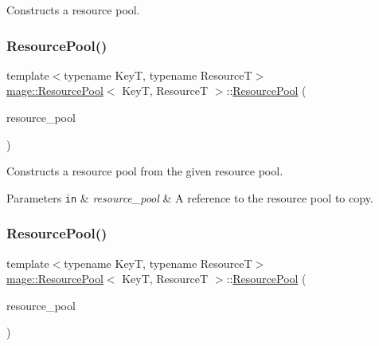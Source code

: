 Constructs a resource pool. \hypertarget{classmage_1_1_resource_pool_a82253c9c4adfc120a813dfe811dd5e91}{}\label{classmage_1_1_resource_pool_a82253c9c4adfc120a813dfe811dd5e91} 
\subsubsection{\texorpdfstring{Resource\+Pool()}{ResourcePool()}\hspace{0.1cm}{\footnotesize\ttfamily [2/3]}}
{\footnotesize\ttfamily template$<$typename KeyT, typename ResourceT$>$ \\
\hyperlink{classmage_1_1_resource_pool}{mage\+::\+Resource\+Pool}$<$ KeyT, ResourceT $>$\+::\hyperlink{classmage_1_1_resource_pool}{Resource\+Pool} (\begin{DoxyParamCaption}\item[{const \hyperlink{classmage_1_1_resource_pool}{Resource\+Pool}$<$ KeyT, ResourceT $>$ \&}]{resource\+\_\+pool }\end{DoxyParamCaption})\hspace{0.3cm}{\ttfamily [delete]}}

Constructs a resource pool from the given resource pool.


\begin{DoxyParams}[1]{Parameters}
\mbox{\tt in}  & {\em resource\+\_\+pool} & A reference to the resource pool to copy. \\
\hline
\end{DoxyParams}
\hypertarget{classmage_1_1_resource_pool_adf8c262e3fb0c01c8efb9650bf05951b}{}\label{classmage_1_1_resource_pool_adf8c262e3fb0c01c8efb9650bf05951b} 
\subsubsection{\texorpdfstring{Resource\+Pool()}{ResourcePool()}\hspace{0.1cm}{\footnotesize\ttfamily [3/3]}}
{\footnotesize\ttfamily template$<$typename KeyT, typename ResourceT$>$ \\
\hyperlink{classmage_1_1_resource_pool}{mage\+::\+Resource\+Pool}$<$ KeyT, ResourceT $>$\+::\hyperlink{classmage_1_1_resource_pool}{Resource\+Pool} (\begin{DoxyParamCaption}\item[{\hyperlink{classmage_1_1_resource_pool}{Resource\+Pool}$<$ KeyT, ResourceT $>$ \&\&}]{resource\+\_\+pool }\end{DoxyParamCaption})}

